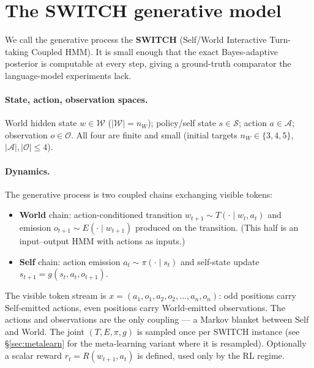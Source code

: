 \documentclass[11pt]{article}
\begin{document}
\section{The SWITCH generative model}
\label{sec:switch}

We call the generative process the \textbf{SWITCH} (Self/World Interactive
Turn-taking Coupled HMM). It is small enough that the exact Bayes-adaptive
posterior is computable at every step, giving a ground-truth comparator the
language-model experiments lack.

\paragraph{State, action, observation spaces.} World hidden state
$w\in\mathcal{W}$ ($|\mathcal{W}|=n_W$); policy/self state $s\in\mathcal{S}$;
action $a\in\mathcal{A}$; observation $o\in\mathcal{O}$. All four are finite and
small (initial targets $n_W\in\{3,4,5\}$, $|\mathcal{A}|,|\mathcal{O}|\le 4$).

\paragraph{Dynamics.} The generative process is two coupled chains exchanging
visible tokens:
\begin{itemize}
  \item \textbf{World} chain: action-conditioned transition
  $w_{t+1}\sim T(\cdot\mid w_t,a_t)$ and emission $o_{t+1}\sim E(\cdot\mid
  w_{t+1})$ produced on the transition. (This half is an input--output HMM
  \citep{bengio1995iohmm} with actions as inputs.)
  \item \textbf{Self} chain: action emission $a_t\sim\pi(\cdot\mid s_t)$ and
  self-state update $s_{t+1}=g(s_t,a_t,o_{t+1})$.
\end{itemize}
The visible token stream is $x=(a_1,o_1,a_2,o_2,\dots,a_n,o_n)$: odd positions
carry Self-emitted actions, even positions carry World-emitted observations.
The actions and observations are the only coupling --- a Markov blanket between
Self and World. The joint $(T,E,\pi,g)$ is sampled once per SWITCH instance
(see \S\ref{sec:metalearn} for the meta-learning variant where it is resampled).
Optionally a scalar reward $r_t=R(w_{t+1},a_t)$ is defined, used only by the RL
regime.
\end{document}
